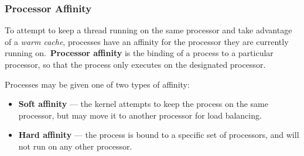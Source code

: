 \documentclass{article}
\begin{document}
\subsubsection{Processor Affinity}
To attempt to keep a thread running on the same processor and take
advantage of a \textit{warm cache}, processes have an affinity for the
processor they are currently running on.\ \textbf{Processor affinity}
is the binding of a process to a particular processor, so that the
process only executes on the designated processor.

Processes may be given one of two types of affinity:
\begin{itemize}
    \item \textbf{Soft affinity} --- the kernel attempts to keep the
          process on the same processor, but may move it to another
          processor for load balancing.
    \item \textbf{Hard affinity} --- the process is bound to a specific
        set of processors, and will not run on any other processor.
\end{itemize}
\end{document}
